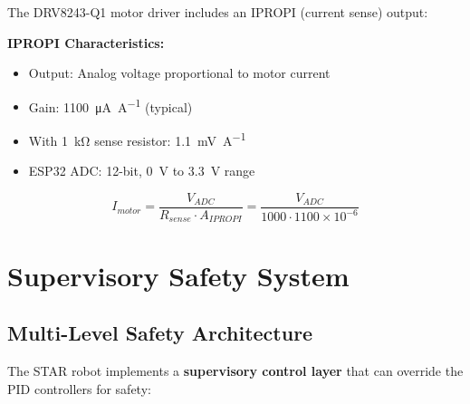 \documentclass[11pt,letterpaper]{article}
\begin{document}
The DRV8243-Q1 motor driver includes an IPROPI (current sense) output:

\begin{center}
\end{center}

\textbf{IPROPI Characteristics:}
\begin{itemize}
    \item Output: Analog voltage proportional to motor current
    \item Gain: \SI{1100}{\micro\ampere\per\ampere} (typical)
    \item With \SI{1}{\kilo\ohm} sense resistor: \SI{1.1}{\milli\volt\per\ampere}
    \item ESP32 ADC: 12-bit, \SI{0}{\volt} to \SI{3.3}{\volt} range
\end{itemize}

\begin{equation}
I_{motor} = \frac{V_{ADC}}{R_{sense} \cdot A_{IPROPI}} = \frac{V_{ADC}}{1000 \cdot 1100 \times 10^{-6}}
\end{equation}

\newpage
\section{Supervisory Safety System}

\subsection{Multi-Level Safety Architecture}

The STAR robot implements a \textbf{supervisory control layer} that can override the PID controllers for safety:
\end{document}
